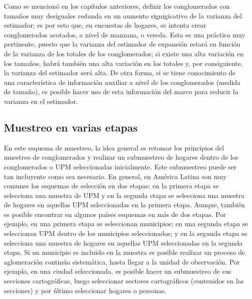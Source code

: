 \documentclass[
  10pt,
  spanish,
]{book}
\begin{document}
Como se mencionó en los capítulos anteriores, definir los conglomerados con tamaños muy desiguales redunda en un aumento signigicativo de la varianza del estimador; es por esto que, en encuestas de hogares, se intenta crear conglomerados acotados, a nivel de manzana, o vereda. Esta es una práctica muy pertinente, puesto que la varianza del estimador de expansión estará en función de la varianza de los totales de los conglomerados; si existe una alta variación en los tamaños, habrá también una alta variación en los totales y, por consiguiente, la varianza del estimador será alta. De otra forma, si se tiene conocimiento de una característica de información auxiliar a nivel de los conglomerados (medida de tamaño), es posible hacer uso de esta información del marco para reducir la varianza en el estimador.

\hypertarget{muestreo-en-varias-etapas}{%
\subsection*{Muestreo en varias etapas}\label{muestreo-en-varias-etapas}}

En este esquema de muestreo, la idea general es retomar los principios del muestreo de conglomerados y realizar un submuestreo de hogares dentro de los conglomerados o UPM seleccionadas inicialmente. Este submuestreo puede ser tan incluyente como sea necesario. En general, en América Latina son muy comunes los esquemas de selección en dos etapas: en la primera etapa se selecciona una muestra de UPM y en la segunda etapa se selecciona una muestra de hogares en aquellas UPM seleccionadas en la primera etapa. Aunque, también es posible encontrar en algunos países esquemas en más de dos etapas. Por ejemplo, en una primera etapa se seleccionan municipios; en una segunda etapa se seleccionan UPM dentro de los municipios seleccionados; y en la segunda etapa se selecciona una muestra de hogares en aquellas UPM seleccionadas en la segunda etapa. Si un municipio es incluido en la muestra es posible realizar un proceso de aglomeración continúa sistemática, hasta llegar a la unidad de observación. Por ejemplo, en una ciudad seleccionada, es posible hacer un submuestreo de sus secciones cartográficas, luego seleccionar sectores cartográficos (contenidos en las secciones) y por último seleccionar hogares o personas.
\end{document}
